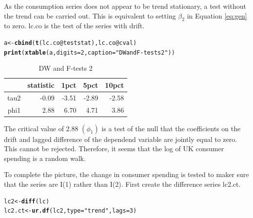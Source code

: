 \documentclass{article}\usepackage{graphicx, color}
\makeatletter
\newcommand{\hlfunctioncall}[1]{\textcolor[rgb]{0.501960784313725,0,0.329411764705882}{\textbf{#1}}}%
\newcommand{\hlstring}[1]{\textcolor[rgb]{0.6,0.6,1}{#1}}%
\newenvironment{kframe}{%
 \def\at@end@of@kframe{}%
 \ifinner\ifhmode%
  \def\at@end@of@kframe{\end{minipage}}%
  \begin{minipage}{\columnwidth}%
 \fi\fi%
 \def\FrameCommand##1{\hskip\@totalleftmargin \hskip-\fboxsep
 \colorbox{shadecolor}{##1}\hskip-\fboxsep
     \hskip-\linewidth \hskip-\@totalleftmargin \hskip\columnwidth}%
 \MakeFramed {\advance\hsize-\width
   \@totalleftmargin\z@ \linewidth\hsize
   \@setminipage}}%
 {\par\unskip\endMakeFramed%
 \at@end@of@kframe}
\newenvironment{knitrout}{}{} %
\makeatother
\begin{document}
As the consumption series does not appear to be trend stationary, a test without the trend can be carried out.  This is equivalent to setting $\beta_2$ in Equation \ref{eq:gen} to zero. lc.co is the test of the series with drift.  
\begin{kframe}
\begin{alltt}
a <- \hlfunctioncall{cbind}(\hlfunctioncall{t}(lc.co@teststat), lc.co@cval)
\hlfunctioncall{print}(\hlfunctioncall{xtable}(a, digits = 2, caption = \hlstring{"DW and F-tests 2"}))
\end{alltt}
\end{kframe}%
\begin{table}[ht]
\begin{center}
\begin{tabular}{rrrrr}
  \hline
 & statistic & 1pct & 5pct & 10pct \\ 
  \hline
tau2 & -0.09 & -3.51 & -2.89 & -2.58 \\ 
  phi1 & 2.88 & 6.70 & 4.71 & 3.86 \\ 
   \hline
\end{tabular}
\caption{DW and F-tests 2}
\end{center}
\end{table}


The critical value of 2.88 $(\phi_1)$ is a test of the null that the coefficients on the drift and lagged difference of the dependend variable are jointly equal to zero.  This cannot be rejected.  Therefore, it seems that the log of UK consumer spending is a random walk.  

To complete the picture, the change in consumer spending is tested to maker sure that the series are I(1) rather than I(2). First create the difference series lc2.ct.  
\begin{knitrout}
\color{fgcolor}\begin{kframe}
\begin{alltt}
lc2 <- \hlfunctioncall{diff}(lc)
lc2.ct <- \hlfunctioncall{ur.df}(lc2, type = \hlstring{"trend"}, lags = 3)
\end{alltt}
\end{kframe}
\end{knitrout}
\end{document}
